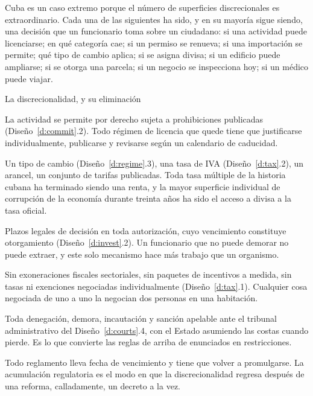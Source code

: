 Cuba es un caso extremo porque el número de superficies discrecionales es extraordinario. Cada
una de las siguientes ha sido, y en su mayoría sigue siendo, una decisión que un funcionario toma
sobre un ciudadano: si una actividad puede licenciarse; en qué categoría cae; si un permiso se
renueva; si una importación se permite; qué tipo de cambio aplica; si se asigna divisa; si un
edificio puede ampliarse; si se otorga una parcela; si un negocio se inspecciona hoy; si un médico
puede viajar.

\begin{design}{La discrecionalidad, y su eliminación}
\label{d:discretion}
\begin{rules}
 La actividad se permite por derecho sujeta a prohibiciones publicadas
(Diseño~\ref{d:commit}.2). Todo régimen de licencia que quede tiene que justificarse
individualmente, publicarse y revisarse según un calendario de caducidad.

 Un tipo de cambio (Diseño~\ref{d:regime}.3), una tasa de IVA
(Diseño~\ref{d:tax}.2), un arancel, un conjunto de tarifas publicadas. Toda tasa múltiple de la
historia cubana ha terminado siendo una renta, y la mayor superficie individual de corrupción de
la economía durante treinta años ha sido el acceso a divisa a la tasa oficial.

 Plazos legales de decisión en toda autorización, cuyo vencimiento
constituye otorgamiento (Diseño~\ref{d:invest}.2). Un funcionario que no puede demorar no puede
extraer, y este solo mecanismo hace más trabajo que un organismo.

 Sin exoneraciones fiscales sectoriales, sin paquetes de incentivos
a medida, sin tasas ni exenciones negociadas individualmente (Diseño~\ref{d:tax}.1). Cualquier
cosa negociada de uno a uno la negocian dos personas en una habitación.

 Toda denegación, demora, incautación y sanción apelable ante el
tribunal administrativo del Diseño~\ref{d:courts}.4, con el Estado asumiendo las costas cuando
pierde. Es lo que convierte las reglas de arriba de enunciados en restricciones.

 Todo reglamento lleva fecha de vencimiento y tiene que volver a promulgarse. La
acumulación regulatoria es el modo en que la discrecionalidad regresa después de una reforma,
calladamente, un decreto a la vez.
\end{rules}
\end{design}

